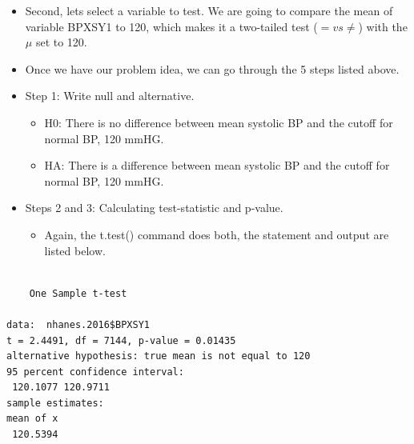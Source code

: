\documentclass[
  letterpaper,
  DIV=11,
  numbers=noendperiod]{scrreprt}
\newenvironment{Shaded}{\begin{snugshade}}{\end{snugshade}}
\newcommand{\AttributeTok}[1]{\textcolor[rgb]{0.40,0.45,0.13}{#1}}
\newcommand{\DecValTok}[1]{\textcolor[rgb]{0.68,0.00,0.00}{#1}}
\newcommand{\FloatTok}[1]{\textcolor[rgb]{0.68,0.00,0.00}{#1}}
\newcommand{\FunctionTok}[1]{\textcolor[rgb]{0.28,0.35,0.67}{#1}}
\newcommand{\NormalTok}[1]{\textcolor[rgb]{0.00,0.23,0.31}{#1}}
\newcommand{\SpecialCharTok}[1]{\textcolor[rgb]{0.37,0.37,0.37}{#1}}
\newcommand{\StringTok}[1]{\textcolor[rgb]{0.13,0.47,0.30}{#1}}
\providecommand{\tightlist}{%
  \setlength{\itemsep}{0pt}\setlength{\parskip}{0pt}}\usepackage{longtable,booktabs,array}
\begin{document}
\begin{itemize}
\item
  Second, lets select a variable to test. We are going to compare the
  mean of variable BPXSY1 to 120, which makes it a two-tailed test
  (\(= vs \neq\)) with the \(\mu\) set to 120.
\item
  Once we have our problem idea, we can go through the 5 steps listed
  above.
\item
  Step 1: Write null and alternative.

  \begin{itemize}
  \tightlist
  \item
    H0: There is no difference between mean systolic BP and the cutoff
    for normal BP, 120 mmHG.
  \item
    HA: There is a difference between mean systolic BP and the cutoff
    for normal BP, 120 mmHG.
  \end{itemize}
\item
  Steps 2 and 3: Calculating test-statistic and p-value.

  \begin{itemize}
  \tightlist
  \item
    Again, the t.test() command does both, the statement and output are
    listed below.
  \end{itemize}
\end{itemize}

\begin{Shaded}
\end{Shaded}

\begin{verbatim}

    One Sample t-test

data:  nhanes.2016$BPXSY1
t = 2.4491, df = 7144, p-value = 0.01435
alternative hypothesis: true mean is not equal to 120
95 percent confidence interval:
 120.1077 120.9711
sample estimates:
mean of x 
 120.5394 
\end{verbatim}
\end{document}
